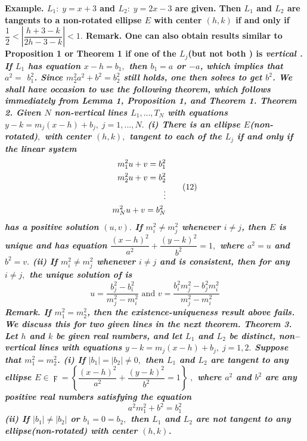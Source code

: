 \nl \bf Example. \rm $L_{1}:\;y=x+3$ and $L_{2}:\;y=2x-3$ are given. Then $L_{1}$ and $L_{2}$ are tangents to a non-rotated ellipse $E$ with center $(h,k)$ if and only if $\dfrac{1}{2}<\left| \dfrac{h+3-k}{2h-3-k}\right| <1.$
\nl \bf Remark. \rm One can also obtain results similar to Proposition 1 or Theorem 1 if one of the $L_{j}$(but not \bf both \rm) is \it vertical \rm. If $L_{1}$ has equation $x-h=b_{1},$ then $b_{1}=a$ or $-a$, which implies that $a^{2}=$ $b_{1}^{2}$. Since $m_{2}^{2}a^{2}+b^{2}=b_{2}^{2}$ still holds, one then solves to get $b^{2}$. \nl We shall have occasion to use the following theorem, which follows immediately from Lemma 1, Proposition  1, and Theorem 1.
\nl \nl \bf Theorem 2. \rm  Given $N$ non-vertical lines $L_{1},...,T_{N}$ with equations $y-k=m_{j}(x-h)+b_{j},\;j=1,...,N.$ \newline (i) There is an ellipse $E$(non-rotated)$,$ with center $(h,k),$ tangent to each of the $L_{j}$ if and only if the linear system $$\split m_{1}^{2}u+v=b_{1}^{2}\\ m_{2}^{2}u+v=b_{2}^{2}\\ \vdots\\m_{N}^{2}u+v=b_{N}^{2}\endsplit\tag{12}$$ has a \bf positive \rm solution $(u,v).$ If $m_{i}^{2}\neq m_{j}^{2}$ whenever $i\neq j$, then $E$ is unique and has equation $\dfrac{(x-h)^{2}}{a^{2}}+\dfrac{(y-k)^{2}}{b^{2}}=1,$ where $a^{2}=u$ and $b^{2}=v.$ \newline (ii) If $m_{i}^{2}\neq m_{j}^{2}$ whenever $i\neq j$ and  is consistent, then for any $i\neq j,$ the unique solution of  is $$u=\dfrac{b_{j}^{2}-b_{i}^{2}}{m_{j}^{2}-m_{i}^{2}}\text{ and }v=\dfrac{b_{i}^{2}m_{j}^{2}-b_{j}^{2}m_{i}^{2}}{m_{j}^{2}-m_{i}^{2}}\tag{13}$$
\nl \bf Remark. \rm If $m_{1}^{2}=m_{2}^{2}$, then the existence-uniqueness result above fails. We discuss this for two given lines in the next theorem.
\nl \nl \bf Theorem 3. \rm  Let $h$ and $k$ be given real numbers, and let $L_{1}$ and $L_{2}$ be distinct, non--vertical lines with equations $y-k=m_{j}(x-h)+b_{j},\;j=1,2.$ Suppose that $m_{1}^{2}=m_{2}^{2}$. \newline (i) If $\left| b_{1}\right| =\left| b_{2}\right| \neq 0,$ then $L_{1}$ and $L_{2}$ are tangent to any ellipse $E\in \digamma =\left\{ \dfrac{(x-h)^{2}}{a^{2}}+\dfrac{(y-k)^{2}}{b^{2}}=1\right\} \;,$ where $a^{2}$ and $b^{2}$ are any positive real numbers satisfying the equation $$a^{2}m_{1}^{2}+b^{2}=b_{1}^{2}\tag{14}$$
(ii) If $\left| b_{1}\right| \neq \left| b_{2}\right| $ or $b_{1}=0=b_{2},$ then $L_{1}$ and $L_{2}$ are not tangent to any ellipse(non-rotated) with center $(h,k)$.
